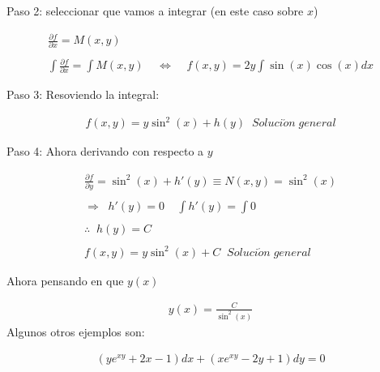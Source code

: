 Paso 2: seleccionar que vamos a integrar (en este caso sobre \(\displaystyle x\))

\begin{equation*}
    \begin{gathered}
        \frac{\partial{f}}{\partial{x}}=M(x,y)\\\\
        \int\frac{\partial{f}}{\partial{x}}=\int M(x,y)\;\;\;\;\Leftrightarrow\;\;\;\;f(x,y)=2y\int\sin(x)\cos(x)dx
    \end{gathered}
\end{equation*}

Paso 3: Resoviendo la integral:

\begin{equation*}
    \begin{gathered}
        f(x,y)=y\sin^{2}(x)+h(y)\;\;Soluci\acute{o}n\;general
    \end{gathered}
\end{equation*}

Paso 4: Ahora derivando con respecto a \(\displaystyle y\)

\begin{equation*}
    \begin{gathered}
        \frac{\partial{f}}{\partial{y}}=\sin^{2}(x)+h'(y)\equiv N(x,y)=\sin^{2}(x)\\\\
        \Rightarrow\;\;h'(y)=0\;\;\;\;\int h'(y)=\int 0\\\\
        \therefore\;\;h(y)=C\\\\
        f(x,y)=y\sin^{2}(x)+C\;\;Soluci\acute{o}n\;general
    \end{gathered}
\end{equation*}

Ahora pensando en que \(\displaystyle y(x)\)

\begin{equation*}
    \begin{gathered}
        y(x)=\frac{C}{\sin^{2}(x)}
    \end{gathered}
\end{equation*}
\clearpage
Algunos otros ejemplos son:

\begin{equation}
    \begin{gathered}
        (ye^{xy}+2x-1)dx+(xe^{xy}-2y+1)dy=0
    \end{gathered}
\end{equation}

